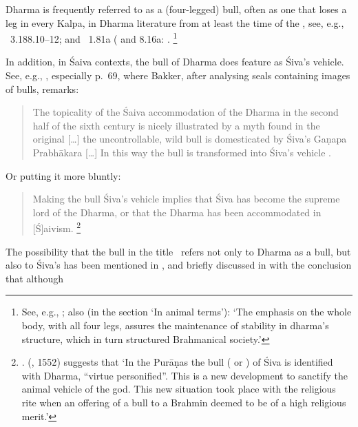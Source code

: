 Dharma is frequently referred to as a (four-legged) 
bull, often as one that loses a leg in every Kalpa,
in Dharma literature from at least the time of the \MBh,
see, e.g., \MBH\ 3.188.10--12; and \Manu\ 1.81a 
( and 8.16a: 
.%
	 \footnote{See, e.g., ; also  
	 (in the section `In animal terms'): 
	 `The emphasis on the whole body, with all four legs, assures 
	 the maintenance of stability in dharma's structure, which in 
	 turn structured Brahmanical society.'}

In addition, in Śaiva contexts, the bull of Dharma
does feature as Śiva's vehicle. See, e.g., 
, especially p.~69,
where Bakker, after analysing seals containing images of
bulls, remarks:


\begin{quote}
The topicality of the Śaiva accommodation 
of the Dharma in the second half of the 
sixth century is nicely illustrated by a myth found in the
original  [\dots]
the uncontrollable, wild bull  is 
domesticated by Śiva's Gaṇapa Prabhākara [\dots]
In this way the bull is transformed into Śiva’s vehicle . 
\end{quote}

\noindent
Or putting it more bluntly: 

\begin{quote}
Making the bull Śiva's vehicle implies that Śiva has become
the supreme lord of the Dharma, or that the Dharma has 
been accommodated in [Ś]aivism.%
	\footnote{.
	\citeauthor{bhattacharya_nandin_1977} 		
			(\citeyear{bhattacharya_nandin_1977}, {1552}) 
			suggests that `In the Purāṇas the bull
		( or 
		) 
	of Śiva is identified with Dharma, ``virtue personified''. 
		This is a new development to sanctify the animal 
		vehicle of the god. This new situation took place with the 		
		religious rite when an offering of a bull to a Brahmin   
		deemed to be	of a high religious merit.'}
\end{quote}

\noindent
The possibility that the bull in the title \Vss\ refers 
not only to Dharma as a bull, but also
to Śiva's  has been mentioned
in , and briefly
discussed in  
with the conclusion that although 

